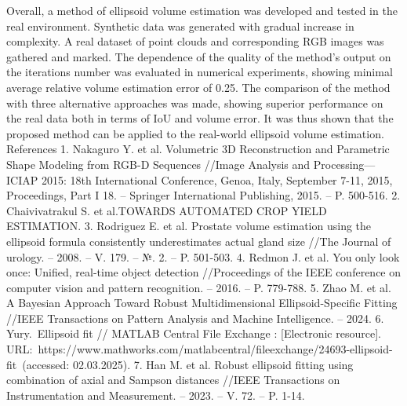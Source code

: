 Overall, a method of ellipsoid volume estimation was developed and tested in the real environment. Synthetic data was generated with gradual increase in complexity. A real dataset of point clouds and corresponding RGB images was gathered and marked. The dependence of the quality of the method's output on the iterations number was evaluated in numerical experiments, showing minimal average relative volume estimation error of 0.25. The comparison of the method with three alternative approaches was made, showing superior performance on the real data both in terms of IoU and volume error. It was thus shown that the proposed method can be applied to the real-world ellipsoid volume estimation.
References
    1. Nakaguro Y. et al. Volumetric 3D Reconstruction and Parametric Shape Modeling from RGB-D Sequences //Image Analysis and Processing—ICIAP 2015: 18th International Conference, Genoa, Italy, September 7-11, 2015, Proceedings, Part I 18. – Springer International Publishing, 2015. – P. 500-516. 
    2. Chaivivatrakul S. et al.TOWARDS AUTOMATED CROP YIELD ESTIMATION.
    3. Rodriguez E. et al. Prostate volume estimation using the ellipsoid formula consistently underestimates actual gland size //The Journal of urology. – 2008. – V. 179. – №. 2. – P. 501-503.
    4. Redmon J. et al. You only look once: Unified, real-time object detection //Proceedings of the IEEE conference on computer vision and pattern recognition. – 2016. – P. 779-788.
    5. Zhao M. et al. A Bayesian Approach Toward Robust Multidimensional Ellipsoid-Specific Fitting //IEEE Transactions on Pattern Analysis and Machine Intelligence. – 2024.
    6. Yury. Ellipsoid fit // MATLAB Central File Exchange : [Electronic resource]. URL: https://www.mathworks.com/matlabcentral/fileexchange/24693-ellipsoid-fit (accessed: 02.03.2025).
    7. Han M. et al. Robust ellipsoid fitting using combination of axial and Sampson distances //IEEE Transactions on Instrumentation and Measurement. – 2023. – V. 72. – P. 1-14.





